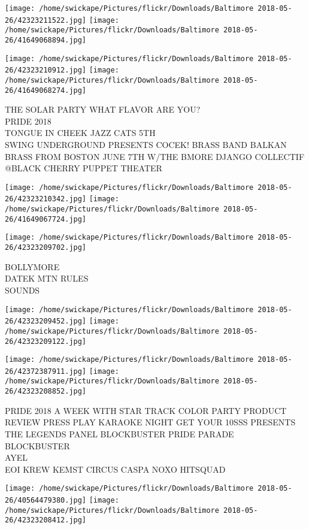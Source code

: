 \documentclass[10pt,letterpaper]{article}
\begin{document}
\texttt{[image: /home/swickape/Pictures/flickr/Downloads/Baltimore 2018-05-26/42323211522.jpg]}
\texttt{[image: /home/swickape/Pictures/flickr/Downloads/Baltimore 2018-05-26/41649068894.jpg]}

\texttt{[image: /home/swickape/Pictures/flickr/Downloads/Baltimore 2018-05-26/42323210912.jpg]}
\texttt{[image: /home/swickape/Pictures/flickr/Downloads/Baltimore 2018-05-26/41649068274.jpg]}

THE SOLAR PARTY WHAT FLAVOR ARE YOU?\\
PRIDE 2018\\
TONGUE IN CHEEK JAZZ CATS 5TH\\
SWING UNDERGROUND PRESENTS COCEK!  BRASS BAND BALKAN BRASS FROM BOSTON JUNE 7TH W/THE BMORE DJANGO COLLECTIF @BLACK CHERRY PUPPET THEATER
\pagebreak

\texttt{[image: /home/swickape/Pictures/flickr/Downloads/Baltimore 2018-05-26/42323210342.jpg]}
\texttt{[image: /home/swickape/Pictures/flickr/Downloads/Baltimore 2018-05-26/41649067724.jpg]}

\vspace{0.25in}
\texttt{[image: /home/swickape/Pictures/flickr/Downloads/Baltimore 2018-05-26/42323209702.jpg]}

BOLLYMORE\\
DATEK MTN RULES\\
SOUNDS
\pagebreak

\texttt{[image: /home/swickape/Pictures/flickr/Downloads/Baltimore 2018-05-26/42323209452.jpg]}
\texttt{[image: /home/swickape/Pictures/flickr/Downloads/Baltimore 2018-05-26/42323209122.jpg]}

\texttt{[image: /home/swickape/Pictures/flickr/Downloads/Baltimore 2018-05-26/42372387911.jpg]}
\texttt{[image: /home/swickape/Pictures/flickr/Downloads/Baltimore 2018-05-26/42323208852.jpg]}

PRIDE 2018 A WEEK WITH STAR TRACK COLOR PARTY PRODUCT REVIEW PRESS PLAY KARAOKE NIGHT GET YOUR 10SSS PRESENTS THE LEGENDS PANEL BLOCKBUSTER PRIDE PARADE\\
BLOCKBUSTER\\
AYEL\\
EOI KREW KEMST CIRCUS CASPA NOXO HITSQUAD
\pagebreak

\texttt{[image: /home/swickape/Pictures/flickr/Downloads/Baltimore 2018-05-26/40564479380.jpg]}
\texttt{[image: /home/swickape/Pictures/flickr/Downloads/Baltimore 2018-05-26/42323208412.jpg]}
\end{document}
